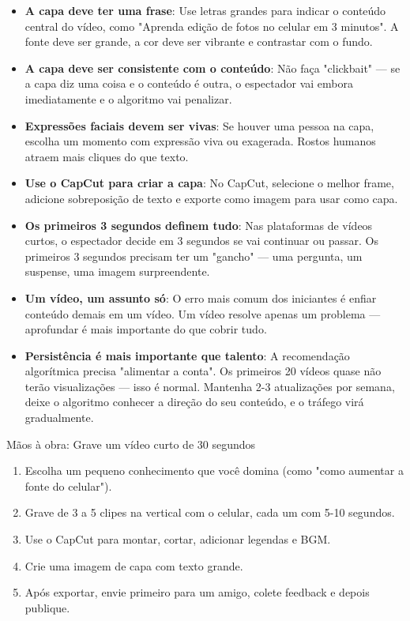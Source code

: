 \begin{itemize}
  \item \textbf{A capa deve ter uma frase}: Use letras grandes para indicar o conteúdo central do vídeo, como "Aprenda edição de fotos no celular em 3 minutos". A fonte deve ser grande, a cor deve ser vibrante e contrastar com o fundo.
  \item \textbf{A capa deve ser consistente com o conteúdo}: Não faça "clickbait" — se a capa diz uma coisa e o conteúdo é outra, o espectador vai embora imediatamente e o algoritmo vai penalizar.
  \item \textbf{Expressões faciais devem ser vivas}: Se houver uma pessoa na capa, escolha um momento com expressão viva ou exagerada. Rostos humanos atraem mais cliques do que texto.
  \item \textbf{Use o CapCut para criar a capa}: No CapCut, selecione o melhor frame, adicione sobreposição de texto e exporte como imagem para usar como capa.
\end{itemize}


\begin{itemize}
  \item \textbf{Os primeiros 3 segundos definem tudo}: Nas plataformas de vídeos curtos, o espectador decide em 3 segundos se vai continuar ou passar. Os primeiros 3 segundos precisam ter um "gancho" — uma pergunta, um suspense, uma imagem surpreendente.
  \item \textbf{Um vídeo, um assunto só}: O erro mais comum dos iniciantes é enfiar conteúdo demais em um vídeo. Um vídeo resolve apenas um problema — aprofundar é mais importante do que cobrir tudo.
  \item \textbf{Persistência é mais importante que talento}: A recomendação algorítmica precisa "alimentar a conta". Os primeiros 20 vídeos quase não terão visualizações — isso é normal. Mantenha 2-3 atualizações por semana, deixe o algoritmo conhecer a direção do seu conteúdo, e o tráfego virá gradualmente.
\end{itemize}

\begin{tcbpractice}{Mãos à obra: Grave um vídeo curto de 30 segundos}
\begin{enumerate}
  \item Escolha um pequeno conhecimento que você domina (como "como aumentar a fonte do celular").
  \item Grave de 3 a 5 clipes na vertical com o celular, cada um com 5-10 segundos.
  \item Use o CapCut para montar, cortar, adicionar legendas e BGM.
  \item Crie uma imagem de capa com texto grande.
  \item Após exportar, envie primeiro para um amigo, colete feedback e depois publique.
\end{enumerate}

\end{tcbpractice}

